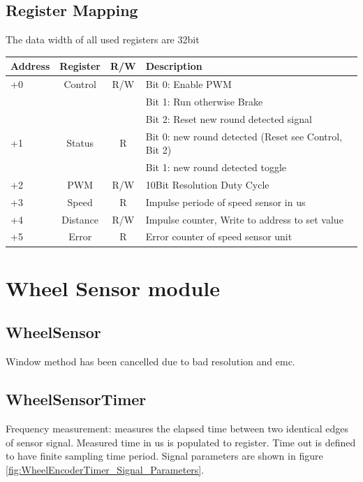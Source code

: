 \documentclass {scrartcl}
\begin{document}
\subsection{Register Mapping}
The data width of all used registers are 32bit
\begin{center}
  \begin{tabular}{ | l | c | c | l|}
    \hline
		\textbf{Address} & \textbf{Register} & \textbf{R/W} & \textbf{Description} \\
		\hline
		+0 & Control & R/W & Bit 0: Enable PWM \\
		 & & & Bit 1: Run otherwise Brake \\
		 & & & Bit 2: Reset new round detected signal\\
		\hline
		+1 & Status & R & Bit 0: new round detected (Reset see Control, Bit 2) \\
		& & & Bit 1: new round detected toggle \\
		\hline
		+2 & PWM & R/W & 10Bit Resolution Duty Cycle  \\
		\hline
		+3 & Speed & R & Impulse periode of speed sensor in us \\
		\hline
		+4 & Distance & R/W & Impulse counter, Write to address to set value \\
    \hline
		+5 & Error & R & Error counter of speed sensor unit \\
    \hline

  \end{tabular}
\end{center}

\section{Wheel Sensor module}
\subsection{WheelSensor}
Window method has been cancelled due to bad resolution and emc.

\subsection{WheelSensorTimer}

Frequency measurement: measures the elapsed time between two identical edges of sensor signal. Measured time in us is populated to register. Time out is defined to have finite sampling time period. Signal parameters are shown in figure \ref{fig:WheelEncoderTimer_Signal_Parameters}.
\end{document}
